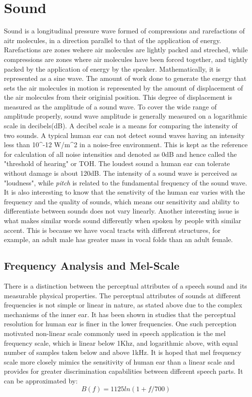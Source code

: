 \documentclass[a4paper,11pt]{kth-mag}
\begin{document}
\section{Sound}
Sound is a longitudinal pressure wave formed of compressions and rarefactions
of aitr molecules, in a direction parallel to that of the application of
energy. Rarefactions are zones wehere air molecules are lightly packed and streched,
while compressions are zones where air molecules have been forced
together, and tightly packed by the application of energy by the speaker.
Mathematically, it is represented as a sine wave. The amount of work done to
generate the energy that sets the air molecules in motion is represented by
the amount of displacement of the air molecules from their originial position.
This degree of displacement is measured as the amplitude of a sound wave. 
To cover the wide range of amplitude properly, sound wave amplitude
is generally measured on a logarithmic scale in decibels(dB). A decibel
scale is a means for comparing the intensity of two sounds.
A typical human ear can not detect sound waves having an intensity less than
10^{-12} W/m^{2} in a noise-free environment.
This is kept as the reference for calculation of all noise intensities and 
denoted as 0dB and hence called the "threshold of hearing" or TOH.
The loudest sound a human ear can tolerate without damage is about 120dB.
The intensity of a sound wave is perceived as "loudness", while 
\textit{pitch} is related to the fundamental frequency of the sound wave.
It is also interesting to know that the senstivity of the human ear varies
with the frequency and the quality of sounds, which means our sensitivity 
and ability to differentiate between sounds does not vary linearly. 
Another interesting issue is what makes similar words sound differently
when spoken by people with similar accent. This is because we have 
vocal tracts with different structures, for example, an adult male has
greater mass in vocal folds than an adult female. 
\subsection{Frequency Analysis and Mel-Scale} 
There is a distinction between the perceptual attributes of a speech
sound and its measurable physical properties. The perceptual attributes
of sounds at different frequencies is not simple or linear in nature, as
stated above due to the complex mechanisms of the inner ear. It has been
shown in studies that the perceptual resolution for human ear is finer
in the lower frequencies. One such perception motivated non-linear scale
commonly used in speech application is the mel frequency scale, which is
linear below 1Khz, and logarithmic above, with equal number of samples taken
below and above 1kHz. It is hoped that mel frequency scale more closely
mimics the sensitivity of human ear than a linear scale and provides
for greater discrimination capabilities between different speech parts.
It can be approximated by:
\begin{equation}
B(f) = 1125ln(1 + f/700)
\end{equation} 
\end{document}
